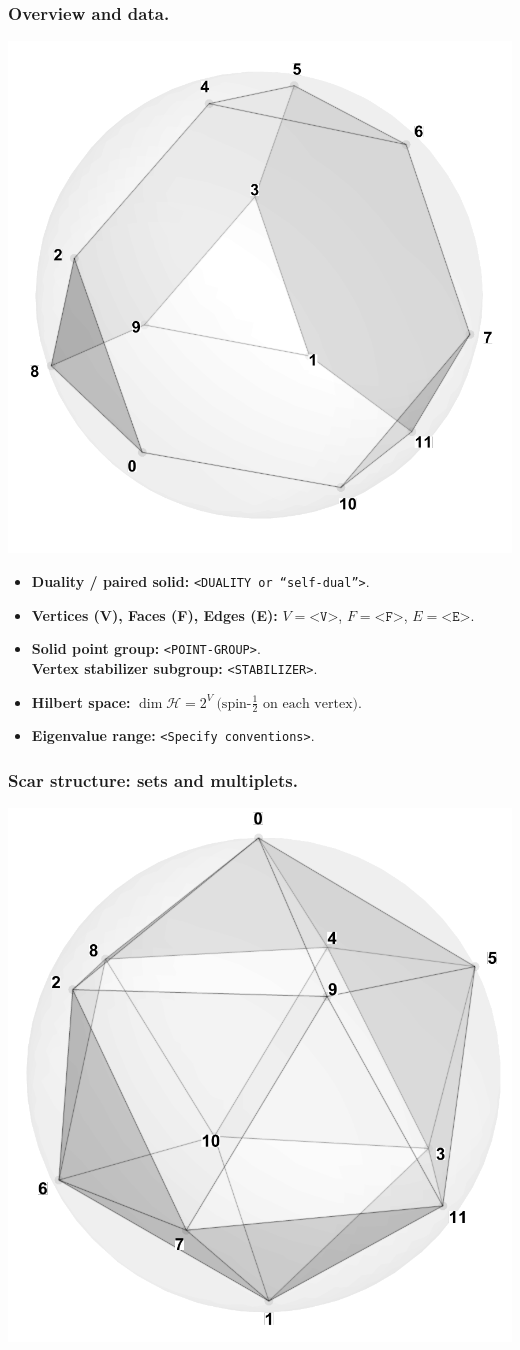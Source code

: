 \documentclass[11pt,a4paper]{article}
\begin{document}
\subsubsection*{Overview and data.}
\begin{center}
  \includegraphics[width=.6\linewidth]{truncatedtetrahedron}
\end{center}

\begin{itemize}[leftmargin=1.5em]
  \item \textbf{Duality / paired solid:} \texttt{<DUALITY or “self-dual”>}.
  \item \textbf{Vertices (V), Faces (F), Edges (E):} $V=\texttt{<V>}$,\; $F=\texttt{<F>}$,\; $E=\texttt{<E>}$.
  \item \textbf{Solid point group:} \texttt{<POINT-GROUP>}.\\
        \textbf{Vertex stabilizer subgroup:} \texttt{<STABILIZER>}.
  \item \textbf{Hilbert space:} \(
        \dim\mathcal{H} = 2^{V}\ \text{(spin-$\tfrac12$ on each vertex).}
        \)
  \item \textbf{Eigenvalue range:} \texttt{<Specify conventions>}.
\end{itemize}

\subsubsection*{Scar structure: sets and multiplets.}
\begin{center}
  \includegraphics[width=.6\linewidth]{icosahedron}
\end{center}
\end{document}
